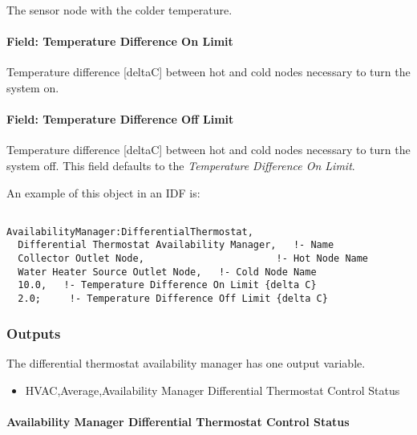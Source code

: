 The sensor node with the colder temperature.

\paragraph{Field: Temperature Difference On Limit}\label{field-temperature-difference-on-limit}

Temperature difference {[}deltaC{]} between hot and cold nodes necessary to turn the system on.

\paragraph{Field: Temperature Difference Off Limit}\label{field-temperature-difference-off-limit}

Temperature difference {[}deltaC{]} between hot and cold nodes necessary to turn the system off. This field defaults to the \emph{Temperature Difference On Limit}.

An example of this object in an IDF is:

\begin{lstlisting}

AvailabilityManager:DifferentialThermostat,
  Differential Thermostat Availability Manager,   !- Name
  Collector Outlet Node,                       !- Hot Node Name
  Water Heater Source Outlet Node,   !- Cold Node Name
  10.0,   !- Temperature Difference On Limit {delta C}
  2.0;     !- Temperature Difference Off Limit {delta C}
\end{lstlisting}

\subsubsection{Outputs}\label{outputs-3-020}

The differential thermostat availability manager has one output variable.

\begin{itemize}
\tightlist
\item
  HVAC,Average,Availability Manager Differential Thermostat Control Status
\end{itemize}

\paragraph{Availability Manager Differential Thermostat Control Status}\label{availability-manager-differential-thermostat-control-status}

